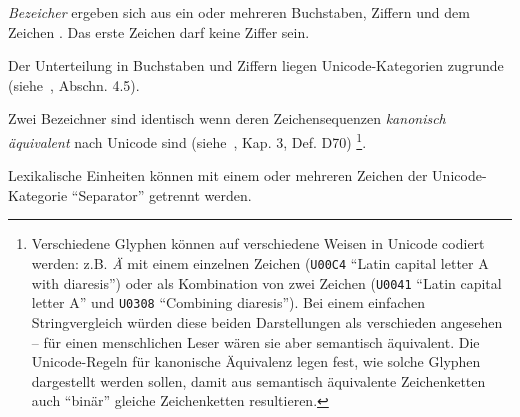 \emph{Bezeicher} ergeben sich aus ein oder mehreren Buchstaben, Ziffern und dem Zeichen \Gt{\_}. Das erste Zeichen
darf keine Ziffer sein.

Der Unterteilung in Buchstaben und Ziffern liegen Unicode-Kategorien zugrunde (siehe~\cite{unicode}, Abschn. 4.5).

Zwei Bezeichner sind identisch wenn deren Zeichensequenzen \emph{kanonisch äquivalent} nach Unicode sind (siehe~\cite{unicode}, Kap. 3, Def. D70)
\footnote{Verschiedene Glyphen können auf verschiedene Weisen in Unicode codiert werden: z.B. \emph{Ä}
mit einem einzelnen Zeichen (\texttt{U\plus{}00C4} ``Latin capital letter A with diaresis'') oder als Kombination
von zwei Zeichen (\texttt{U\plus{}0041} ``Latin capital letter A'' und \texttt{U\plus{}0308} ``Combining diaresis'').
Bei einem einfachen Stringvergleich würden diese beiden Darstellungen als verschieden angesehen --
für einen menschlichen Leser wären sie aber semantisch äquivalent.
Die Unicode-Regeln für kanonische Äquivalenz legen fest, wie solche Glyphen
dargestellt werden sollen, damit aus semantisch äquivalente Zeichenketten auch "`binär"' gleiche
Zeichenketten resultieren.}.

Lexikalische Einheiten können mit einem oder mehreren Zeichen der Unicode-Kategorie "`Separator"' getrennt werden.


